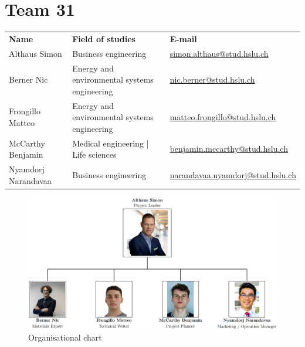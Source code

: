 \documentclass{article}
\begin{document}
\newpage
\section*{Team 31}
\renewcommand{\arraystretch}{1.5}
\begin{tabular}{@{}p{}p{}p{}@{}}
\textbf{Name} & \textbf{Field of studies} & \textbf{E-mail} \\
Althaus Simon & Business engineering & \href{mailto:simon.althaus@stud.hslu.ch}{simon.althaus@stud.hslu.ch} \\
Berner Nic & Energy and environmental systems engineering & \href{mailto:nic.berner@stud.hslu.ch}{nic.berner@stud.hslu.ch} \\
Frongillo Matteo & Energy and environmental systems engineering & \href{mailto:matteo.frongillo@stud.hslu.ch}{matteo.frongillo@stud.hslu.ch} \\
McCarthy Benjamin & Medical engineering | Life sciences & \href{mailto:benjamin.mccarthy@stud.hslu.ch}{benjamin.mccarthy@stud.hslu.ch} \\
Nyamdorj Narandavaa & Business engineering & \href{mailto:narandavaa.nyamdorj@stud.hslu.ch}{narandavaa.nyamdorj@stud.hslu.ch} \\
\end{tabular}

\vspace*{1cm}
\begin{figure}[ht!]
    \centering
    \includegraphics[width=\textwidth]{media/organisational_chart.png}
    \caption{Organisational chart}
    \label{fig:organisational_chart}
\end{figure}

\newpage
\end{document}

